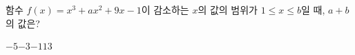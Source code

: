 함수 $f(x)=x^3+ax^2+9x-1$이 감소하는 $x$의 값의 범위가 $1\le x\le b$일 때, $a+b$의 값은? 
\begin{choices32}{$-5$}{$-3$}{$-1$}{$1$}{$3$}\end{choices32}
